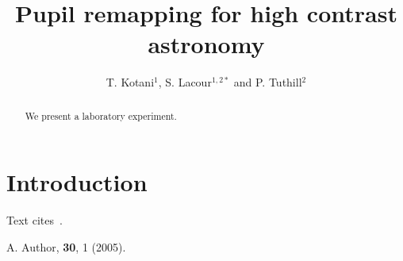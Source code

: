 \documentclass[10pt,letterpaper]{article}
\begin{document}
\title{Pupil remapping for high contrast astronomy}
\author{T. Kotani$^1$, S. Lacour$^{1,2*}$ and P. Tuthill$^2$}
\address{$^1$LESIA, Observatoire de Paris, Meudon, France\\
$^2$School of Physics, Sydney University, NSW 2006, Australia}
\begin{abstract}
We present a laboratory experiment.
\end{abstract}
\section{Introduction}
Text cites~\cite{r1}.
\begin{thebibliography}{10}
 A. Author, \ol \textbf{30}, 1 (2005).
\end{thebibliography}
\end{document}
